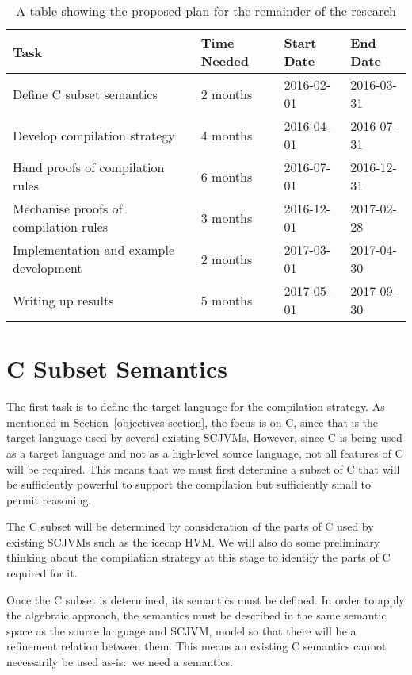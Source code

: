 \documentclass[a4paper,10pt]{report}
\begin{document}
\begin{table}[ht]
  \centering
  \begin{tabular}{llll}
    \hline
    Task & Time Needed & Start Date & End Date  \\
    \hline
    Define C subset semantics & 2 months & 2016-02-01 & 2016-03-31 \\
    Develop compilation strategy & 4 months & 2016-04-01 & 2016-07-31 \\
    Hand proofs of compilation rules & 6 months & 2016-07-01 & 2016-12-31 \\
    Mechanise proofs of compilation rules & 3 months & 2016-12-01 & 2017-02-28 \\
    Implementation and example development & 2 months & 2017-03-01 & 2017-04-30 \\
    Writing up results & 5 months & 2017-05-01 & 2017-09-30 \\
    \hline
  \end{tabular}
  \caption{A table showing the proposed plan for the remainder of the research}
  \label{research-plan-table}
\end{table}

\section{C Subset Semantics}

The first task is to define the target language for the compilation
strategy.
As mentioned in Section~\ref{objectives-section}, the focus is on C,
since that is the target language used by several existing SCJVMs.
However, since C is being used as a target language and not as a
high-level source language, not all features of C will be required.
This means that we must first determine a subset of C that will be
sufficiently powerful to support the compilation but sufficiently
small to permit reasoning.

The C subset will be determined by consideration of the parts of C
used by existing SCJVMs such as the icecap HVM.
We will also do some preliminary thinking about the compilation
strategy at this stage to identify the parts of C required for it.

Once the C subset is determined, its semantics must be defined.
In order to apply the algebraic approach, the semantics must be
described in the same semantic space as the source language and SCJVM,
model so that there will be a refinement relation between them.
This means an existing C semantics cannot necessarily be used
as-is:~we need a \Circus{} semantics.
\end{document}
